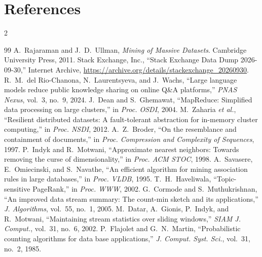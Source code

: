 \documentclass[11pt,a4paper]{article}
\begin{document}
\section{References}
\vspace{-14pt}
\begin{multicols}{2}
{\footnotesize
\renewcommand{\section}[2]{}
\begin{thebibliography}{99}
\setlength{\itemsep}{0pt}
\setlength{\parskip}{0pt}
 A.~Rajaraman and J.~D.~Ullman, \emph{Mining of Massive Datasets}. Cambridge University Press, 2011.
 Stack Exchange, Inc., ``Stack Exchange Data Dump 2026-09-30,'' Internet Archive, \url{https://archive.org/details/stackexchange_20260930}.
 R.~M.~del Rio-Chanona, N.~Laurentsyeva, and J.~Wachs, ``Large language models reduce public knowledge sharing on online Q\&A platforms,'' \emph{PNAS Nexus}, vol.~3, no.~9, 2024.
 J.~Dean and S.~Ghemawat, ``MapReduce: Simplified data processing on large clusters,'' in \emph{Proc. OSDI}, 2004.
 M.~Zaharia \emph{et al.}, ``Resilient distributed datasets: A fault-tolerant abstraction for in-memory cluster computing,'' in \emph{Proc. NSDI}, 2012.
 A.~Z.~Broder, ``On the resemblance and containment of documents,'' in \emph{Proc. Compression and Complexity of Sequences}, 1997.
 P.~Indyk and R.~Motwani, ``Approximate nearest neighbors: Towards removing the curse of dimensionality,'' in \emph{Proc. ACM STOC}, 1998.
 A.~Savasere, E.~Omiecinski, and S.~Navathe, ``An efficient algorithm for mining association rules in large databases,'' in \emph{Proc. VLDB}, 1995.
 T.~H.~Haveliwala, ``Topic-sensitive PageRank,'' in \emph{Proc. WWW}, 2002.
 G.~Cormode and S.~Muthukrishnan, ``An improved data stream summary: The count-min sketch and its applications,'' \emph{J. Algorithms}, vol.~55, no.~1, 2005.
 M.~Datar, A.~Gionis, P.~Indyk, and R.~Motwani, ``Maintaining stream statistics over sliding windows,'' \emph{SIAM J. Comput.}, vol.~31, no.~6, 2002.
 P.~Flajolet and G.~N.~Martin, ``Probabilistic counting algorithms for data base applications,'' \emph{J. Comput. Syst. Sci.}, vol.~31, no.~2, 1985.
\end{thebibliography}}
\end{multicols}
\end{document}
